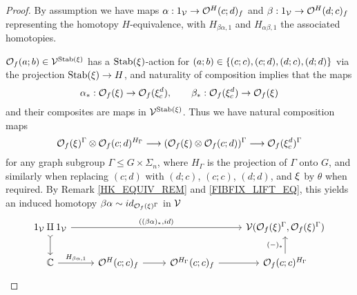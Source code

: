 \documentclass[a4paper,10pt
]{article}%
\renewcommand{\1}{\ensuremath{\mathbb{id}}}
\begin{document}
\begin{proof}
      By assumption we have maps
      $\alpha: 1_{\mathcal V} \to \mathcal{O}^H(c;d)_f$ and $\beta: 1_{\mathcal V} \to \mathcal{O}^H(d;c)_f$
      representing the homotopy $H$-equivalence,
      with $H_{\beta\alpha,1}$ and $H_{\alpha\beta,1}$ the associated homotopies. 

      $\mathcal{O}_f(a;b) \in \mathcal V^{\mathrm{Stab}(\xi)}$ has a $\mathrm{Stab}(\xi)$-action 
      for $(a;b) \in \left\{(c;c), (c;d), (d;c), (d;d)\right\}$
      via the projection $\mathrm{Stab}(\xi) \to H$,
      and naturality of composition implies that the maps
      \begin{equation}
            \alpha_{\**}: \O_f(\ksi) \to \O_f(\ksi_c^d),
            \qquad
            \beta_{\**}: \O_f(\ksi_c^d) \to \O_f(\ksi)
      \end{equation}
      and their composites are maps in $\mathcal V^{\mathrm{Stab}(\xi)}$.
      Thus we have natural composition maps
      \begin{equation}
            \mathcal{O}_f(\xi)^\Gamma \otimes \mathcal{O}_f(c;d)^{H_\Gamma} \longrightarrow
            (\mathcal{O}_f(\xi) \otimes \mathcal{O}_f(c;d))^\Gamma \longrightarrow
            \mathcal{O}_f(\xi_c^d)^\Gamma
      \end{equation}
      for any graph subgroup $\Gamma \leq G \times \Sigma_n$,
      where $H_\Gamma$ is the projection of $\Gamma$ onto $G$,
      and similarly when replacing $(c;d)$ with $(d;c)$, $(c;c)$, $(d;d)$,
      and $\xi$ by $\theta$ when required.
      By Remark \ref{HK_EQUIV_REM} and \eqref{FIBFIX_LIFT_EQ},
      this yields an induced homotopy $\beta\alpha \sim id_{\mathcal{O}_f(\xi)^{\Gamma}}$ in $\mathcal V$
      \begin{equation}
            \begin{tikzcd}
                  1_\V \amalg 1_\V \arrow[d, tail] \arrow[rrr, "{((\beta\alpha)_{\**}, id)}"]
                  &&&
                  \V(\O_f(\ksi)^\Gamma, \O_f(\ksi)^\Gamma)
                  \\                  
                  \mathbb C \arrow[r, "H_{\beta\alpha,1}"]
                  &
                  \O^H(c;c)_f \arrow[r]
                  &
                  \O^{H_\Gamma}(c;c)_f \arrow[r]
                  &
                  \O_f(c;c)^{H_\Gamma} \arrow[u, "{(-)_{\**}}"]

\end{tikzcd}
\end{equation}
\end{proof}
\end{document}
